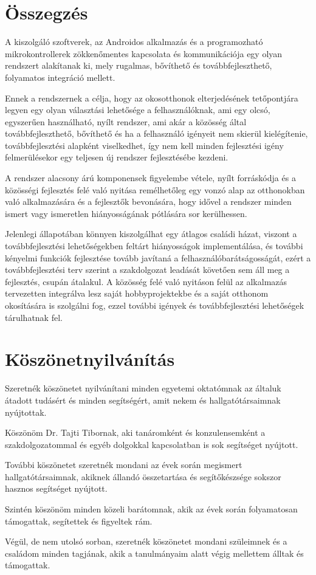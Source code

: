 \documentclass[]{thesis-ekf}
\theoremstyle{definition}
\theoremstyle{remark}
\begin{document}
\chapter*{Összegzés}
A kiszolgáló szoftverek, az Androidos alkalmazás és a programozható mikrokontrollerek zökkenőmentes kapcsolata
és kommunikációja egy olyan rendszert alakítanak ki, mely rugalmas, bővíthető és továbbfejleszthető, folyamatos
integráció mellett.

Ennek a rendszernek a célja, hogy az okosotthonok elterjedésének tetőpontjára legyen egy olyan választási lehetősége a
felhasználóknak, ami egy olcsó, egyszerűen használható, nyílt rendszer, ami akár a közösség
által továbbfejleszthető, bővíthető és ha a felhasználó igényeit nem skierül kielégítenie, továbbfejlesztési
alapként viselkedhet, így nem kell minden fejlesztési igény felmerülésekor egy teljesen új rendszer fejlesztésébe
kezdeni.

A rendszer alacsony árú komponensek figyelembe vétele, nyílt forráskódja és a közösségi fejlesztés felé való nyitása
remélhetőleg egy vonzó alap az otthonokban való alkalmazására és a fejlesztők bevonására, hogy idővel a rendszer minden
ismert vagy ismeretlen hiányosságának pótlására sor kerülhessen.

Jelenlegi állapotában könnyen kiszolgálhat egy átlagos családi házat, viszont a továbbfejlesztési lehetőségekben
feltárt hiányosságok implementálása, és további kényelmi funkciók fejlesztése tovább javítaná a felhasználóbarátságosságát, ezért a továbbfejlesztési terv szerint a szakdolgozat leadását követően sem áll meg a
fejlesztés, csupán átalakul. A közösség felé való nyitáson felül az alkalmazás tervezetten integrálva lesz
saját hobbyprojektekbe és a saját otthonom okosítására is szolgálni fog, ezzel további igények és továbbfejlesztési
lehetőségek tárulhatnak fel.

\chapter*{Köszönetnyilvánítás}
Szeretnék köszönetet nyilvánítani minden egyetemi oktatómnak az általuk átadott tudásért és minden segítségért,
amit nekem és hallgatótársaimnak nyújtottak.
\par
Köszönöm Dr. Tajti Tibornak, aki tanáromként és konzulensemként a szakdolgozatommal és egyéb dolgokkal kapcsolatban
is sok segítséget nyújtott.
\par
További köszönetet szeretnék mondani az évek során megismert hallgatótársaimnak, akiknek állandó összetartása és
segítőkészsége sokszor hasznos segítséget nyújtott.
\par
Szintén köszönöm minden közeli barátomnak, akik az évek során folyamatosan támogattak, segítettek és figyeltek rám.
\par
Végül, de nem utolsó sorban, szeretnék köszönetet mondani szüleimnek és a családom minden tagjának,
akik a tanulmányaim alatt végig mellettem álltak és támogattak.
\end{document}
